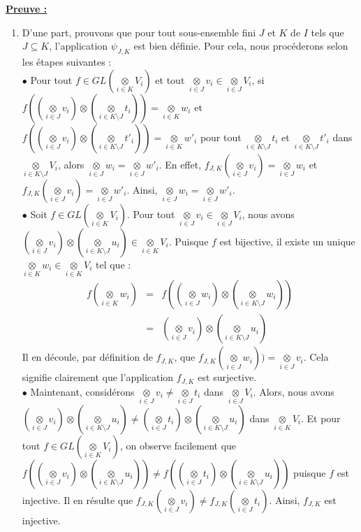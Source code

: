 \documentclass[a4paper, 14pt]{report}
\begin{document}
\begin{onehalfspace}
{\textbf{\underline{Preuve :}}
	\begin{enumerate}
		\item D'une part, prouvons que pour tout sous-ensemble fini $J$ et $K$ de $I$ tels que $J\subseteq K$, l'application $\psi_{J,K}$ est bien définie. Pour cela, nous procéderons selon les étapes suivantes :\\
		$\bullet$ Pour tout $f\in GL(\underset{i\in K}\otimes V_i)$ et tout $\underset{i\in J}\otimes v_i\in \underset{i\in J}\otimes V_i$, si $f((\underset{i\in J}\otimes v_i)\otimes (\underset{i\in K\setminus J}\otimes t_i))= \underset{i\in K}\otimes w_i$ et $f((\underset{i\in J}\otimes v_i)\otimes (\underset{i\in K\setminus J}\otimes t'_i))= \underset{i\in K}\otimes w'_i$ pour tout $\underset{i\in K\setminus J}\otimes t_i$ et $\underset{i\in K\setminus J}\otimes t'_i$ dans $\underset{i\in K\setminus J}\otimes V_i$, alors $\underset{i\in J}\otimes w_i= \underset{i\in J}\otimes w'_i$. En effet, $f_{J,K}(\underset{i\in J}\otimes v_i)= \underset{i\in J}\otimes w_i$ et $f_{J,K}(\underset{i\in J}\otimes v_i)= \underset{i\in J}\otimes w'_i$. Ainsi, $\underset{i\in J}\otimes w_i= \underset{i\in J}\otimes w'_i$.\\
		$\bullet$ Soit $f\in GL(\underset{i\in K}\otimes V_i)$. Pour tout $\underset{i\in J}\otimes v_i\in \underset{i\in J}\otimes V_i$, nous avons $(\underset{i\in J}\otimes v_i)\otimes (\underset{i\in K\setminus J}\otimes u_i)\in \underset{i\in K}\otimes V_i$. Puisque $f$ est bijective, il existe un unique $\underset{i\in K}\otimes w_i\in \underset{i\in K}\otimes V_i$ tel que :
		$$\begin{array}{rlll}
			f(\underset{i\in K}\otimes w_i)&=& f((\underset{i\in J}\otimes w_i)\otimes (\underset{i\in K\setminus J}\otimes w_i))\\
			&=& (\underset{i\in J}\otimes v_i)\otimes (\underset{i\in K\setminus J}\otimes u_i)
		\end{array}$$
		Il en découle, par définition de $f_{J,K}$, que $f_{J,K}(\underset{i\in J}\otimes w_i))= \underset{i\in J}\otimes v_i$. Cela signifie clairement que l'application $f_{J,K}$ est surjective.\\
		$\bullet$ Maintenant, considérons $\underset{i\in J}\otimes v_i\neq \underset{i\in J}\otimes t_i$ dans $\underset{i\in J}\otimes V_i$. Alors, nous avons $(\underset{i\in J}\otimes v_i)\otimes (\underset{i\in K\setminus J}\otimes u_i)\neq (\underset{i\in J}\otimes t_i)\otimes (\underset{i\in K\setminus J}\otimes u_i)$ dans $\underset{i\in K}\otimes V_i$. Et pour tout $f\in GL(\underset{i\in K}\otimes V_i)$, on observe facilement que $f((\underset{i\in J}\otimes v_i)\otimes (\underset{i\in K\setminus J}\otimes u_i))\neq f((\underset{i\in J}\otimes t_i)\otimes (\underset{i\in K\setminus J}\otimes u_i))$ puisque $f$ est injective. Il en résulte que $f_{J,K}(\underset{i\in J}\otimes v_i)\neq f_{J,K}(\underset{i\in J}\otimes t_i)$. Ainsi, $f_{J,K}$ est injective.\\
		

\end{enumerate}}
\end{onehalfspace}
\end{document}
